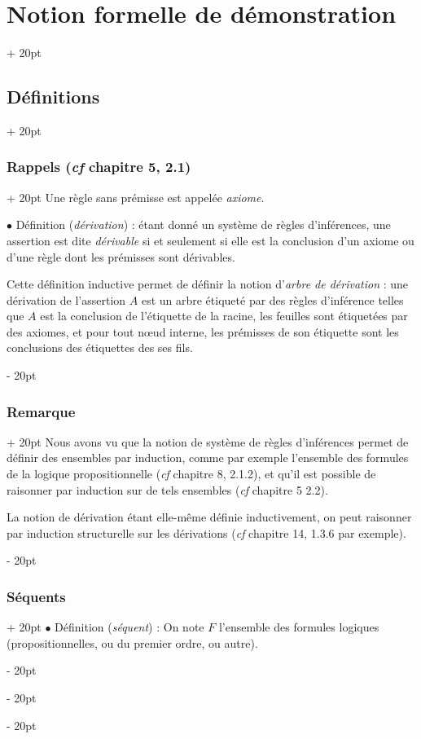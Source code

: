 \documentclass[a4paper, 12pt, twoside]{article}
\newcommand{\ind}[1][20pt]{\advance\leftskip + #1}
\newcommand{\deind}[1][20pt]{\advance\leftskip - #1}
\newenvironment{indt}[2][20pt]{#2 \par \ind[#1]}{\par \deind} %
\begin{document}
\begin{indt}{\section{Notion formelle de démonstration}}
\begin{indt}{\subsection{Définitions}}
\begin{indt}{\subsubsection{Rappels (\textit{cf} chapitre 5, 2.1)}}
                Une règle sans prémisse est appelée \emph{axiome}.

                \vspace{12pt}
                
                $\bullet$ Définition (\emph{dérivation}) : étant donné un système de règles d'inférences, une assertion est dite \emph{dérivable} si et seulement si elle est la conclusion d'un axiome ou d'une règle dont les prémisses sont dérivables.

                Cette définition inductive permet de définir la notion d'\emph{arbre de dérivation} : une dérivation de l'assertion $A$ est un arbre étiqueté par des règles d'inférence telles que $A$ est la conclusion de l'étiquette de la racine, les feuilles sont étiquetées par des axiomes, et pour tout n\oe ud interne, les prémisses de son étiquette sont les conclusions des étiquettes des ses fils.
            \end{indt}

            \vspace{12pt}
            
            \begin{indt}{\subsubsection{Remarque}}
                Nous avons vu que la notion de système de règles d'inférences permet de définir des ensembles par induction, comme par exemple l'ensemble des formules de la logique propositionnelle (\textit{cf} chapitre 8, 2.1.2), et qu'il est possible de raisonner par induction sur de tels ensembles (\textit{cf} chapitre 5 2.2).

                La notion de dérivation étant elle-même définie inductivement, on peut raisonner par induction structurelle sur les dérivations (\textit{cf} chapitre 14, 1.3.6 par exemple).
            \end{indt}

            \vspace{12pt}
            
            \begin{indt}{\subsubsection{Séquents}}
                $\bullet$ Définition (\emph{séquent}) : On note $F$ l'ensemble des formules logiques (propositionnelles, ou du premier ordre, ou autre).


\end{indt}
\end{indt}
\end{indt}
\end{document}
